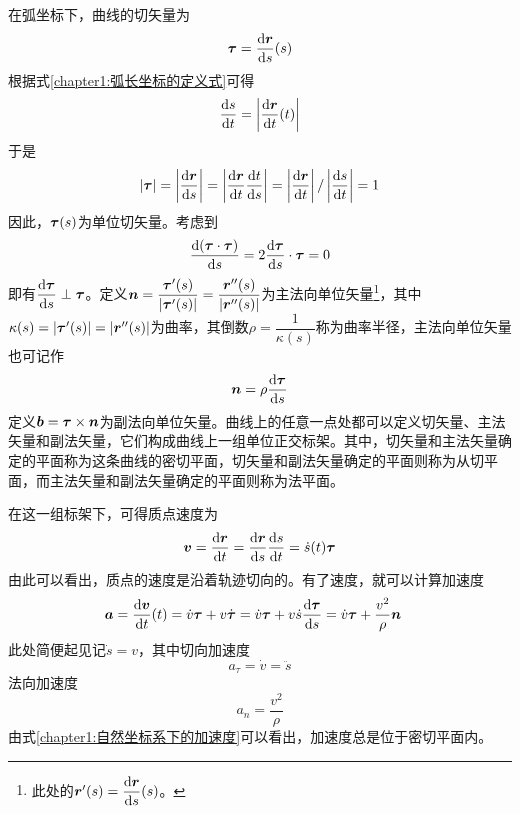 在弧坐标下，曲线的切矢量为
\begin{equation}
	\boldsymbol{\tau} = \frac{\mathrm{d} \boldsymbol{r}}{\mathrm{d} s}(s)
\end{equation}
根据式\eqref{chapter1:弧长坐标的定义式}可得
\begin{equation}
	\frac{\mathrm{d} s}{\mathrm{d} t} = \left|\frac{\mathrm{d} \boldsymbol{r}}{\mathrm{d} t}(t)\right|
\end{equation}
于是
\begin{equation}
	|\boldsymbol{\tau}| = \left|\frac{\mathrm{d}\boldsymbol{r}}{\mathrm{d} s}\right| = \left|\frac{\mathrm{d}\boldsymbol{r}}{\mathrm{d} t}\frac{\mathrm{d} t}{\mathrm{d} s}\right| = \left|\frac{\mathrm{d}\boldsymbol{r}}{\mathrm{d} t}\right| / \left|\frac{\mathrm{d} s}{\mathrm{d} t}\right| = 1
\end{equation}
因此，$\boldsymbol{\tau}(s)$为单位切矢量。考虑到
\begin{equation*}
	\frac{\mathrm{d} (\boldsymbol{\tau} \cdot \boldsymbol{\tau})}{\mathrm{d} s} = 2 \frac{\mathrm{d} \boldsymbol{\tau}}{\mathrm{d} s} \cdot \boldsymbol{\tau} = 0
\end{equation*}
即有$\dfrac{\mathrm{d} \boldsymbol{\tau}}{\mathrm{d} s} \perp \boldsymbol{\tau}$。定义$\boldsymbol{n} = \dfrac{\boldsymbol{\tau}'(s)}{|\boldsymbol{\tau}'(s)|} = \dfrac{\boldsymbol{r}''(s)}{|\boldsymbol{r}''(s)|}$为主法向单位矢量\footnote{此处的$\boldsymbol{r}'(s) = \dfrac{\mathrm{d}\boldsymbol{r}}{\mathrm{d} s}(s)$。}，其中$\kappa(s) = |\boldsymbol{\tau}'(s)| = |\boldsymbol{r}''(s)|$为曲率，其倒数$\rho = \dfrac{1}{\kappa(s)}$称为曲率半径，主法向单位矢量也可记作
\begin{equation}
	\boldsymbol{n} = \rho\frac{\mathrm{d} \boldsymbol{\tau}}{\mathrm{d} s}
\end{equation}
定义$\boldsymbol{b} = \boldsymbol{\tau} \times \boldsymbol{n}$为副法向单位矢量。曲线上的任意一点处都可以定义切矢量、主法矢量和副法矢量，它们构成曲线上一组单位正交标架。其中，切矢量和主法矢量确定的平面称为这条曲线的密切平面，切矢量和副法矢量确定的平面则称为从切平面，而主法矢量和副法矢量确定的平面则称为法平面。

在这一组标架下，可得质点速度为
\begin{equation}
	\boldsymbol{v} = \frac{\mathrm{d}\boldsymbol{r}}{\mathrm{d} t} = \frac{\mathrm{d}\boldsymbol{r}}{\mathrm{d} s} \frac{\mathrm{d} s}{\mathrm{d} t} = \dot{s}(t) \boldsymbol{\tau}
\end{equation}
由此可以看出，质点的速度是沿着轨迹切向的。有了速度，就可以计算加速度
\begin{align}
	\boldsymbol{a} & = \frac{\mathrm{d} \boldsymbol{v}}{\mathrm{d} t}(t) = \dot{v} \boldsymbol{\tau} + v \dot{\boldsymbol{\tau}} = \dot{v} \boldsymbol{\tau} + v\dot{s} \frac{\mathrm{d} \boldsymbol{\tau}}{\mathrm{d} s} = \dot{v} \boldsymbol{\tau} + \frac{v^2}{\rho} \boldsymbol{n}
	\label{chapter1:自然坐标系下的加速度}
\end{align}
此处简便起见记$\dot{s}=v$，其中切向加速度
\begin{equation}
	a_\tau = \dot{v} = \ddot{s}
\end{equation}
法向加速度
\begin{equation}
	a_n = \frac{v^2}{\rho}
\end{equation}
由式\eqref{chapter1:自然坐标系下的加速度}可以看出，加速度总是位于密切平面内。

